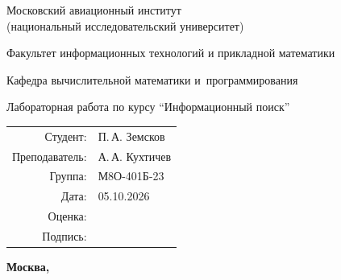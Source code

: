 \begin{titlepage}
\begin{center}
\bfseries

{\Large Московский авиационный институт\\ (национальный исследовательский университет)

}

\vspace{48pt}

{\large Факультет информационных технологий и прикладной математики
}

\vspace{36pt}

{\large Кафедра вычислительной математики и~программирования

}


\vspace{48pt}

Лабораторная работа  по курсу \enquote{Информационный поиск}

\end{center}

\vspace{72pt}

\begin{flushright}
\begin{tabular}{rl}
Студент: & П.\,А. Земсков \\
Преподаватель: & А.\,А. Кухтичев \\
Группа: & М8О-401Б-23 \\
Дата: & 05.10.2026 \\
Оценка: & \\
Подпись: & \\
\end{tabular}
\end{flushright}

\vfill

\begin{center}
\bfseries
Москва, \the\year
\end{center}
\end{titlepage}

\pagebreak
